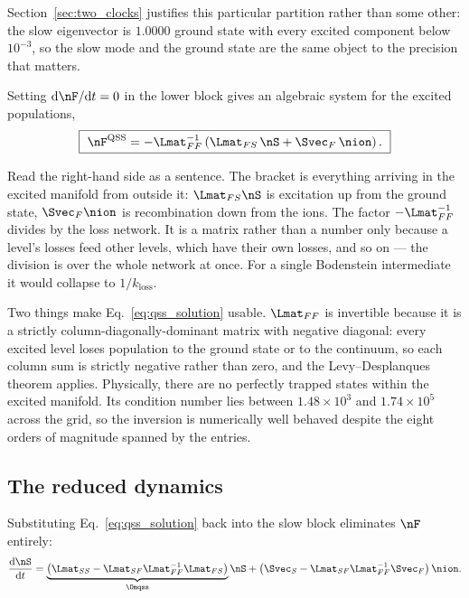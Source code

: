 Section~\ref{sec:two_clocks} justifies this particular partition rather than
some other: the slow eigenvector is $1.0000$ ground state with every excited
component below $10^{-3}$, so the slow mode and the ground state are the same
object to the precision that matters.

Setting $\mathrm{d}\nF/\mathrm{d}t = 0$ in the lower block gives an algebraic
system for the excited populations,
\begin{equation}
  \boxed{\ \nF^{\mathrm{QSS}}
  = -\Lmat_{FF}^{-1}\left(\Lmat_{FS}\,\nS + \Svec_F\,\nion\right).\ }
  \label{eq:qss_solution}
\end{equation}

Read the right-hand side as a sentence. The bracket is everything arriving in
the excited manifold from outside it: $\Lmat_{FS}\nS$ is excitation up from the
ground state, $\Svec_F\nion$ is recombination down from the ions. The factor
$-\Lmat_{FF}^{-1}$ divides by the loss network. It is a matrix rather than a
number only because a level's losses feed other levels, which have their own
losses, and so on --- the division is over the whole network at once. For a
single Bodenstein intermediate it would collapse to $1/k_{\mathrm{loss}}$.

Two things make Eq.~\eqref{eq:qss_solution} usable. $\Lmat_{FF}$ is invertible
because it is a strictly column-diagonally-dominant matrix with negative
diagonal: every excited level loses population to the ground state or to the
continuum, so each column sum is strictly negative rather than zero, and the
Levy--Desplanques theorem applies. Physically, there are no perfectly trapped
states within the excited manifold. Its condition number lies between
$1.48\times10^{3}$ and $1.74\times10^{5}$ across the grid, so the inversion is
numerically well behaved despite the eight orders of magnitude spanned by the
entries.

\subsection{The reduced dynamics}

Substituting Eq.~\eqref{eq:qss_solution} back into the slow block eliminates
$\nF$ entirely:
\begin{equation}
  \frac{\mathrm{d}\nS}{\mathrm{d}t}
  = \underbrace{\left(\Lmat_{SS} - \Lmat_{SF}\Lmat_{FF}^{-1}\Lmat_{FS}\right)}_{\Omqss}\nS
  + \left(\Svec_S - \Lmat_{SF}\Lmat_{FF}^{-1}\Svec_F\right)\nion .
  \label{eq:reduced}
\end{equation}

